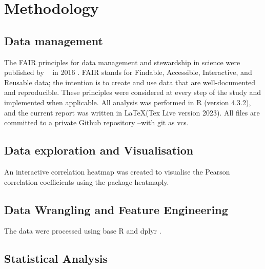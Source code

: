 \documentclass{amsart}
\theoremstyle{plain}
\begin{document}
\section{Methodology}
\subsection{Data management}
The FAIR principles for data management and stewardship in science were published by  ~\citeauthor{Wilkinson2016TheStewardship} in 2016 \cite{Wilkinson2016TheStewardship}. FAIR stands for Findable, Accessible, Interactive, and Reusable data; the intention is to create and use data that are well-documented and reproducible. These principles were considered at every step of the study and implemented when applicable. All analysis was performed in R (version 4.3.2), and the current report was written in \LaTeX (Tex Live version 2023). All files are committed to a private Github repository --with git as \acrfull{vcs}.

\subsection{Data exploration and Visualisation}
An interactive correlation heatmap was created to visualise the Pearson correlation coefficients using the package \textsf{heatmaply}. 

\subsection{Data Wrangling and Feature Engineering}
The data were processed using base R and \textsf{dplyr} \cite{dplyr}.
   

\subsection{Statistical Analysis}
\end{document}
